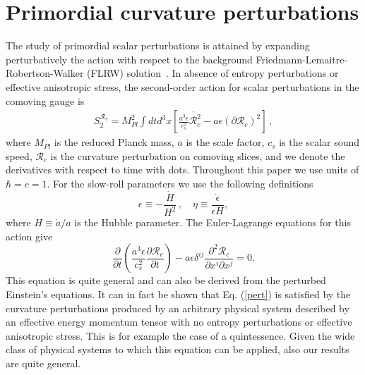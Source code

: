 \documentclass[aps,prl,amsmath,nofootinbib,twocolumn]{revtex4}
\newcommand{\3}{\partial}
\newcommand{\4}{\frac}
\newcommand{\5}{\delta}
\renewcommand\({\left(}
\renewcommand\){\right)}
\renewcommand\[{\left[}
\renewcommand\]{\right]}
\newcommand{\be}{\begin{equation}}
\newcommand{\ee}{\end{equation}}
\newcommand{\bea}{\begin{eqnarray}}
\newcommand{\eea}{\end{eqnarray}}
\newcommand{\eqn}[1]{(\ref{#1})}
\begin{document}
\section{Primordial curvature perturbations}\label{pctp}
The study of primordial scalar perturbations is attained by expanding perturbatively the action with respect to the background Friedmann-Lemaitre-Robertson-Walker (FLRW) solution~\cite{m,Cheung:2007st}. In absence of entropy perturbations or effective anisotropic stress, the second-order action for scalar perturbations in the comoving gauge is
\bea\label{eq:s2}
 S_2^{\mathcal{R}_{c}} = M_{Pl}^2 \int dt d^3x\left[\frac{a^3 \epsilon}{c_s^2} \dot{\mathcal{R}_{c}^2}-a\epsilon(\partial \mathcal{R}_{c})^2 \right] \,,
\eea
where $ M_{Pl}$ is the reduced Planck mass, $a$ is the scale factor, $c_s$ is the scalar sound speed, $\mathcal{R}_c$ is the curvature perturbation on comoving slices, and we denote the derivatives with respect to time with dots. Throughout this paper we use units of $\hbar=c=1$. For the slow-roll parameters we use the following definitions
\be \label{eq:slowroll}
  \epsilon \equiv -\frac{\dot H}{H^2} \, , \quad \eta \equiv \frac{\dot \epsilon}{\epsilon H},
\ee
where $H \equiv \dot a/a$ is the Hubble parameter. The Euler-Lagrange equations for this action give
\begin{equation}\label{pert}
 \frac{\partial}{\partial t}\left(\frac{a^3 \epsilon}{c_s^2} \frac{\partial \mathcal{R}_{c}}{\partial t}\right)- 
a\epsilon\delta^{ij} \frac{\partial^2 \mathcal{R}_{c}}{\partial x^i\partial x^j}=0.
\end{equation}
This equation is quite general and can also be derived from the perturbed Einstein's equations. It can in fact be shown that Eq. \eqn{pert} is satisfied by the curvature perturbations produced by an arbitrary physical system described by an effective energy momentum tensor with no entropy perturbations or effective anisotropic stress. This is for example the case of a quintessence. Given the wide class of physical systems to which this equation can be applied, also our results are quite general.
\end{document}
